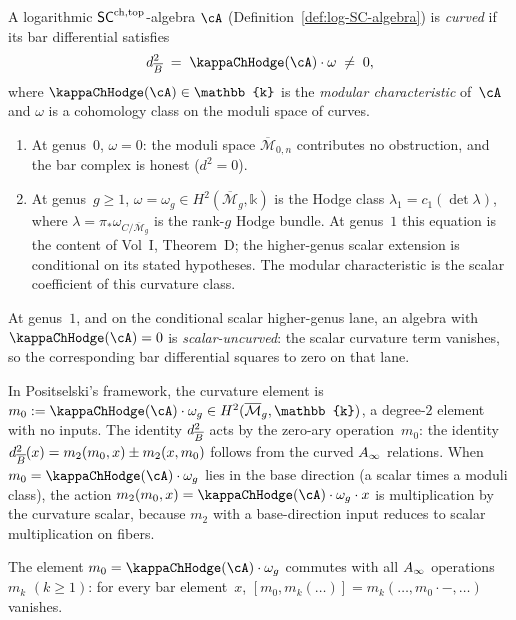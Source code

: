 \begin{definition}
\label{def:curved-Ainf-chiral}
A logarithmic $\mathsf{SC}^{\mathrm{ch},\mathrm{top}}$-algebra $\cA$
(Definition~\ref{def:log-SC-algebra}) is \emph{curved}
if its bar differential satisfies
\[
 d_{\barB}^2 \;=\; \kappaChHodge(\cA) \cdot \omega
 \;\neq\; 0,
\]
where $\kappaChHodge(\cA) \in \mathbb{k}$ is the \emph{modular
characteristic} of~$\cA$ and $\omega$ is a cohomology class on the
moduli space of curves.
\begin{enumerate}[label=\textup{(\roman*)}]
\item At genus~$0$, $\omega = 0$: the moduli space
 $\overline{\mathcal M}_{0,n}$ contributes no obstruction, and the
 bar complex is honest ($d^2 = 0$).
\item At genus~$g \geq 1$, $\omega = \omega_g \in
 H^2(\overline{\mathcal M}_g, \mathbb{k})$ is the Hodge class
 $\lambda_1 = c_1(\det \lambda)$, where
 $\lambda = \pi_* \omega_{C/\overline{\mathcal M}_g}$ is the
 rank-$g$ Hodge bundle.
 At genus~$1$ this equation is the content of Vol~I,
 Theorem~D; the higher-genus scalar extension is conditional
 on its stated hypotheses. The modular characteristic is the scalar
 coefficient of this curvature class.
\end{enumerate}
At genus~$1$, and on the conditional scalar higher-genus lane, an
algebra with $\kappaChHodge(\cA)=0$ is \emph{scalar-uncurved}: the scalar
curvature term vanishes, so the corresponding bar differential squares
to zero on that lane.
\end{definition}

In Positselski's framework, the curvature element is
$m_0 := \kappaChHodge(\cA) \cdot \omega_g
 \in H^2(\overline{\mathcal M}_g, \mathbb{k})$,
a degree-$2$ element with no inputs. The identity
$d_{\overline{B}}^2$ acts by the zero-ary operation~$m_0$: the identity
$d_{\overline{B}}^2(x) = m_2(m_0, x) \pm m_2(x, m_0)$ follows from the
curved $A_\infty$ relations. When
$m_0 = \kappaChHodge(\cA) \cdot \omega_g$ lies in the base direction (a
scalar times a moduli class), the action $m_2(m_0, x) = \kappaChHodge(\cA)
\cdot \omega_g \cdot x$ is multiplication by the curvature scalar,
because $m_2$ with a base-direction input reduces to scalar
multiplication on fibers.

\begin{lemma}
\label{lem:curvature-centrality}
The element $m_0 = \kappaChHodge(\cA) \cdot \omega_g$ commutes with all\/
$A_\infty$ operations $m_k$ $(k \geq 1)$: for every bar element~$x$,
$[m_0, m_k(\ldots)] = m_k(\ldots, m_0 \cdot -, \ldots)$ vanishes.
\end{lemma}

